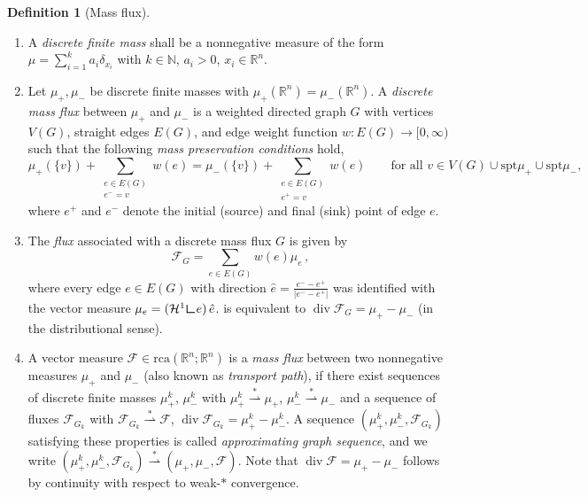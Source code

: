 \documentclass[10pt,a4paper,oneside,final]{article}
\newcommand{\R}{{\mathbb{R}}}
\newcommand{\N}{{\mathbb{N}}}
\DeclareMathOperator{\dv}{div}
\newcommand{\hdone}{\mathcal{H}^1}
\newcommand{\rca}{\mathrm{rca}}
\newcommand{\restr}{{\mbox{\LARGE$\llcorner$}}}
\newcommand{\spt}{{\mathrm{spt}}}
\newcommand{\weakstarto}{\stackrel{*}{\rightharpoonup}}
\newcommand{\flux}{{\mathcal{F}}}
\newcommand{\transportPath}{mass flux}
\newcommand{\TransportPath}{Mass flux}
\numberwithin{equation}{section}
\theoremstyle{plain}
\theoremstyle{definition}
\newtheorem{definition}[theorem]{Definition}
\theoremstyle{remark}
\begin{document}
\begin{definition}[\TransportPath{}]\label{def:mass_fluxes}
\begin{enumerate}
\item A \emph{discrete finite mass} shall be a nonnegative measure of the form $\mu = \sum_{i = 1}^k a_i\delta_{x_i}$ with $k\in\N$, $a_i>0$, $x_i\in \R^n$.

\item Let $\mu_+,\mu_-$ be discrete finite masses with $\mu_+(\R^n)=\mu_-(\R^n)$.
A \emph{discrete \transportPath{}} between $\mu_+$ and $\mu_-$ is a weighted directed graph $G$ with vertices $V(G)$, straight edges $E(G)$, and edge weight function $w : E(G) \to [0,\infty)$ such that the following \emph{mass preservation conditions} hold,
\begin{equation}\label{eqn:massPreservation}
\mu_+(\{v\}) + \sum_{\substack{e \in E(G)\\e^- = v}} w(e) = \mu_-(\{v\}) + \sum_{\substack{e \in E(G)\\e^+ = v}} w(e)
\qquad\text{for all }v\in V(G)\cup\spt\mu_+\cup\spt\mu_-,
\end{equation}
where $e^+$ and $e^-$ denote the initial (source) and final (sink) point of edge $e$.

\item The \emph{flux} associated with a discrete \transportPath{} $G$ is given by
\begin{equation}\label{eqn:graphFlux}
 \flux_G = \sum_{e \in E(G)} w(e)\mu_e\,,
\end{equation}
where every edge $e\in E(G)$ with direction $\hat e=\frac{e^--e^+}{|e^--e^+|}$ was identified with the vector measure $\mu_e = (\hdone\restr e)\, \hat e$.
 is equivalent to $\dv\flux_G = \mu_+ - \mu_-$ (in the distributional sense).

\item A vector measure $\flux\in\rca(\R^n;\R^n)$ is a \emph{\transportPath{}} between two nonnegative measures $\mu_+$ and $\mu_-$ (also known as \emph{transport path}), if there exist sequences of discrete finite masses $\mu_+^k$, $\mu_-^k$ with $\mu_+^k \weakstarto \mu_+$, $\mu_-^k \weakstarto \mu_-$
and a sequence of fluxes $\flux_{G_k}$ with $\flux_{G_k} \weakstarto \flux$, $\dv \flux_{G_k} = \mu_+^k - \mu_-^k$.
A sequence $(\mu_+^k,\mu_-^k,\flux_{G_k})$ satisfying these properties is called \emph{approximating graph sequence}, and we write $(\mu_+^k,\mu_-^k,\flux_{G_k}) \weakstarto (\mu_+,\mu_-,\flux)$.
Note that $\dv\flux=\mu_+-\mu_-$ follows by continuity with respect to weak-$*$ convergence.
\end{enumerate}
\end{definition}
\end{document}
